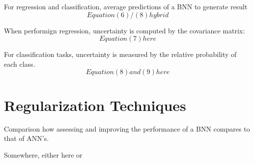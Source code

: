 For regression and classification, average predictions of a BNN to generate result
$$
Equation (6) / (8) hybrid
$$

When performign regression, uncertainty is computed by the covariance matrix:
$$
Equation (7) here
$$

For classification tasks, uncertainty is measured by the relative probability of each class.
$$
Equation (8) and (9) here
$$


\section{Regularization Techniques}

Comparison how assessing and improving the performance of a BNN compares to that of ANN's.

Somewhere, either here or 